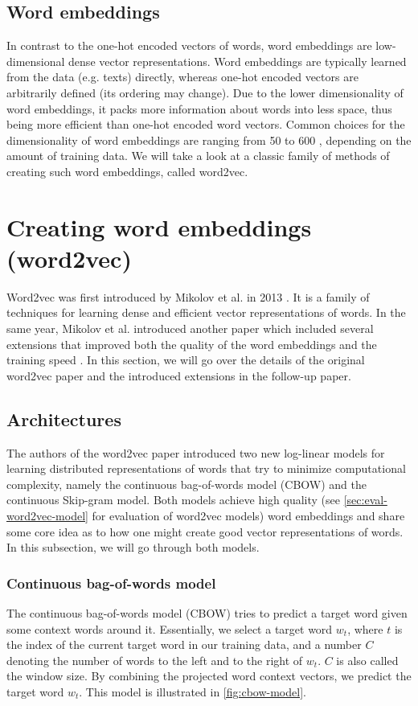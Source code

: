 \subsection{Word embeddings}
In contrast to the one-hot encoded vectors of words, word embeddings are low-dimensional dense vector representations. Word embeddings are typically learned from the data (e.g. texts) directly, whereas one-hot encoded vectors are arbitrarily defined (its ordering may change). Due to the lower dimensionality of word embeddings, it packs more information about words into less space, thus being more efficient than one-hot encoded word vectors. Common choices for the dimensionality of word embeddings are ranging from 50 to 600 \cite{mikolov2013a}, depending on the amount of training data. We will take a look at a classic family of methods of creating such word embeddings, called word2vec.

\section{Creating word embeddings (word2vec)}
Word2vec was first introduced by Mikolov et al. in 2013 \cite{mikolov2013a}. It is a family of techniques for learning dense and efficient vector representations of words. In the same year, Mikolov et al. introduced another paper which included several extensions that improved both the quality of the word embeddings and the training speed \cite{mikolov2013b}. In this section, we will go over the details of the original word2vec paper and the introduced extensions in the follow-up paper.

\subsection{Architectures}
The authors of the word2vec paper introduced two new log-linear models for learning distributed representations of words that try to minimize computational complexity, namely the continuous bag-of-words model (CBOW) and the continuous Skip-gram model. Both models achieve high quality (see \cref{sec:eval-word2vec-model} for evaluation of word2vec models) word embeddings \cite{mikolov2013a} and share some core idea as to how one might create good vector representations of words. In this subsection, we will go through both models.

\subsubsection{Continuous bag-of-words model}
The continuous bag-of-words model (CBOW) tries to predict a target word given some context words around it. Essentially, we select a target word $w_t$, where $t$ is the index of the current target word in our training data, and a number $C$ denoting the number of words to the left and to the right of $w_t$. $C$ is also called the window size. By combining the projected word context vectors, we predict the target word $w_t$. This model is illustrated in \cref{fig:cbow-model}.

